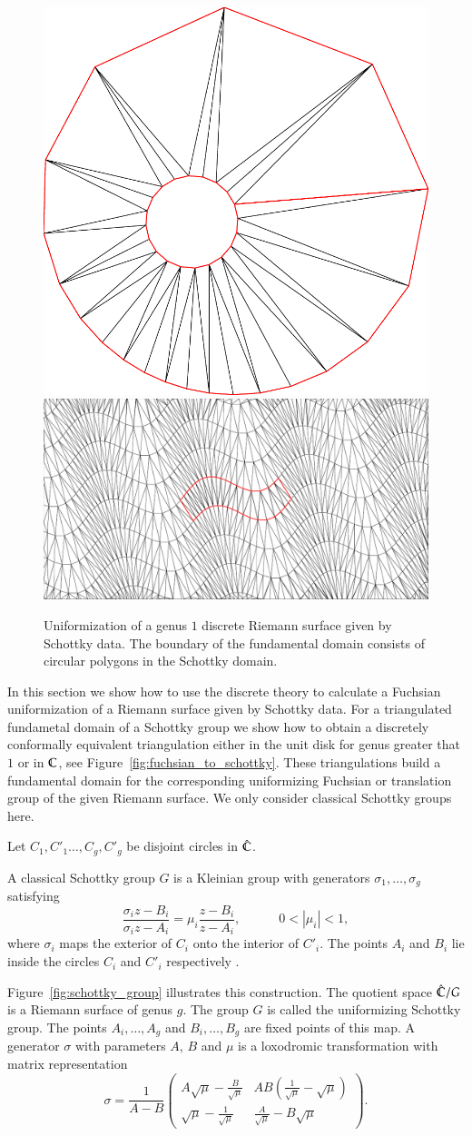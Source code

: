 \documentclass[Thesis.tex]{subfiles}
\begin{document}
\begin{figure}
	\centering
	\includegraphics[width=0.3\linewidth]{image/schottky/g1_schottky_converted.pdf}
	\quad
	\includegraphics[width=0.6\linewidth]{image/schottky/g1_domain_converted.pdf}
	\caption{Uniformization of a genus $1$ discrete Riemann surface given by Schottky data.
	The boundary of the fundamental domain consists of circular polygons in the Schottky domain.}
	\label{fig:fuchsian_to_schottky_genus_1}
\end{figure}

In this section we show how to use the discrete theory to calculate a Fuchsian uniformization of a Riemann surface 
given by Schottky data. For a triangulated fundametal domain of a Schottky group we show how to obtain a discretely
conformally equivalent triangulation either in the unit disk for genus greater that $1$ or in $\mathbb C$, see Figure~\ref{fig:fuchsian_to_schottky}. These triangulations build
a fundamental domain for the corresponding uniformizing Fuchsian or translation group of the given Riemann surface. We only consider classical Schottky groups here.

Let $C_1,C'_1\ldots,C_g,C'_g$ be disjoint circles in $\hat{\mathbb C}$. 
\begin{definition}
A classical Schottky group $G$ is a Kleinian group
with generators $\sigma_1,\ldots,\sigma_g$ satisfying
\[\frac{\sigma_i z - B_i}{\sigma_i z - A_i} = \mu_i \frac{z - B_i}{z - A_i}, \quad\quad\quad 0 < \left|\mu_i\right|<1,\]
where $\sigma_i$ maps the exterior of $C_i$ onto the interior of $C'_i$. The points $A_i$ and $B_i$ lie inside the circles $C_i$ and $C'_i$ respectively \cite{bobenko2011riemann}. 
\end{definition}
Figure~\ref{fig:schottky_group} illustrates this construction.
The quotient space $\hat{\mathbb C}/G$ is a Riemann surface of genus $g$. The group $G$ is called the uniformizing
Schottky group. The points $A_i,\ldots,A_g$ and $B_i,\ldots,B_g$ are fixed points of this map.
A generator $\sigma$ with parameters $A$, $B$ and $\mu$ is a loxodromic transformation with matrix representation 
\[
\sigma = \frac{1}{A-B}
\begin{pmatrix}
	A\sqrt{\mu}-\frac{B}{\sqrt\mu} & AB\left(\frac{1}{\sqrt\mu}-\sqrt{\mu}\right) \\
	\sqrt\mu-\frac{1}{\sqrt\mu} & \frac{A}{\sqrt\mu}-B\sqrt\mu
\end{pmatrix}.
\]
\end{document}
